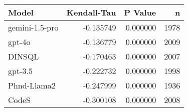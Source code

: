\begin{tabular}{lrrr}
\toprule
Model & Kendall-Tau & P Value & n \\
\midrule
gemini-1.5-pro & -0.135749 & 0.000000 & 1978 \\
gpt-4o & -0.136779 & 0.000000 & 2009 \\
DINSQL & -0.170463 & 0.000000 & 2007 \\
gpt-3.5 & -0.222732 & 0.000000 & 1998 \\
Phnd-Llama2 & -0.247999 & 0.000000 & 1936 \\
CodeS & -0.300108 & 0.000000 & 2008 \\
\bottomrule
\end{tabular}
